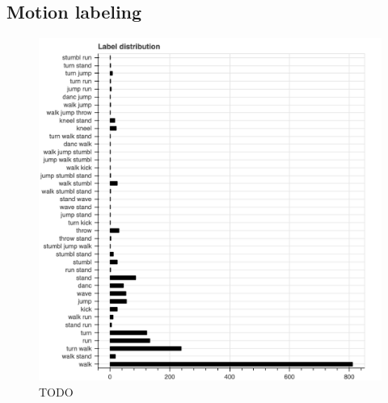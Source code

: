 \subsection{Motion labeling}
\begin{figure}
	\centering
	\includegraphics[width=\textwidth]{img/label-distribution.png}
	\caption{TODO}
	\label{fig:label-distribution}
\end{figure}
